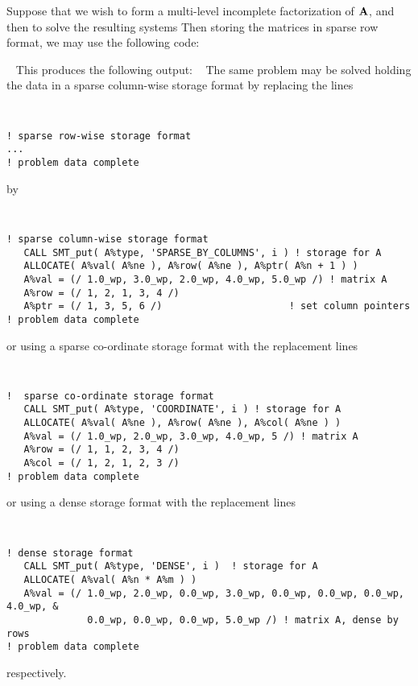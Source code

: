 \documentclass{galahad}
\begin{document}

\galexample
Suppose
that we wish to form a multi-level incomplete factorization of ${\mathbf{A}}$,
and then to solve the resulting systems
Then storing the matrices in sparse row format,
we may use the following code:

{\tt \small
\VerbatimInput{\packageexample}
}
\noindent
This produces the following output:
{\tt \small
\VerbatimInput{\packageresults}
}
\noindent
The same problem may be solved holding the data in
a sparse column-wise storage format by replacing the lines
{\tt \small
\begin{verbatim}
! sparse row-wise storage format
...
! problem data complete
\end{verbatim}
}
\noindent
by
{\tt \small
\begin{verbatim}
! sparse column-wise storage format
   CALL SMT_put( A%type, 'SPARSE_BY_COLUMNS', i ) ! storage for A
   ALLOCATE( A%val( A%ne ), A%row( A%ne ), A%ptr( A%n + 1 ) )
   A%val = (/ 1.0_wp, 3.0_wp, 2.0_wp, 4.0_wp, 5.0_wp /) ! matrix A
   A%row = (/ 1, 2, 1, 3, 4 /)
   A%ptr = (/ 1, 3, 5, 6 /)                      ! set column pointers
! problem data complete
\end{verbatim}
}
\noindent
or using a sparse co-ordinate storage format with the replacement lines
{\tt \small
\begin{verbatim}
!  sparse co-ordinate storage format
   CALL SMT_put( A%type, 'COORDINATE', i ) ! storage for A
   ALLOCATE( A%val( A%ne ), A%row( A%ne ), A%col( A%ne ) )
   A%val = (/ 1.0_wp, 2.0_wp, 3.0_wp, 4.0_wp, 5 /) ! matrix A
   A%row = (/ 1, 1, 2, 3, 4 /)
   A%col = (/ 1, 2, 1, 2, 3 /)
! problem data complete
\end{verbatim}
}
\noindent
or using a dense storage format with the replacement lines
{\tt \small
\begin{verbatim}
! dense storage format
   CALL SMT_put( A%type, 'DENSE', i )  ! storage for A
   ALLOCATE( A%val( A%n * A%m ) )
   A%val = (/ 1.0_wp, 2.0_wp, 0.0_wp, 3.0_wp, 0.0_wp, 0.0_wp, 0.0_wp, 4.0_wp, &
              0.0_wp, 0.0_wp, 0.0_wp, 5.0_wp /) ! matrix A, dense by rows
! problem data complete
\end{verbatim}
}
\noindent
respectively.
\end{document}
